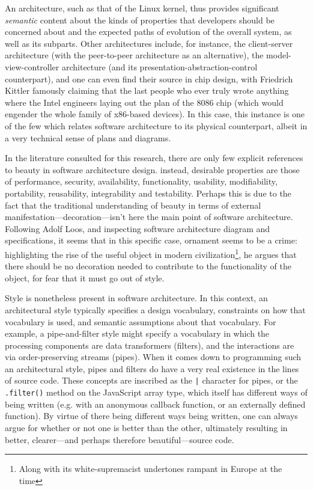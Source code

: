 \documentclass{article}
\begin{document}
An architecture, such as that of the Linux kernel, thus provides significant \emph{semantic}  content  about  the  kinds  of properties that developers should be concerned about and the expected paths of evolution of the overall system, as well as its subparts. Other architectures include, for instance, the client-server architecture (with the peer-to-peer architecture as an alternative), the model-view-controller architecture (and its presentation-abstraction-control counterpart), and one can even find their source in chip design, with Friedrich Kittler famously claiming that the last people who ever truly wrote anything where the Intel engineers laying out the plan of the 8086 chip (which would engender the whole family of x86-based devices)\cite{kittler_there_1997}. In this case, this instance is one of the few which relates software architecture to its physical counterpart, albeit in a very technical sense of plans and diagrams.

In the literature consulted for this research, there are only few explicit references to beauty in software architecture design. instead, desirable properties are those of performance, security, availability, functionality, usability, modifiability, portability, reusability, integrability and testability. Perhaps this is due to the fact that the traditional understanding of beauty in terms of external manifestation—decoration—isn't here the main point of software architecture. Following Adolf Loos, and inspecting software architecture diagram and specifications, it seems that in this specific case, ornament seems to be a crime: highlighting the rise of the useful object in modern civilization\footnote{Along with its white-supremacist undertones rampant in Europe at the time}, he argues that there should be no decoration needed to contribute to the functionality of the object, for fear that it must go out of style.

Style is nonetheless present in software architecture. In this context, an architectural style typically specifies a design vocabulary, constraints on how that vocabulary is used, and semantic assumptions about that vocabulary. For example, a pipe-and-filter style might specify a vocabulary in which the processing components are data transformers (filters), and the interactions are via order-preserving streams (pipes). When it comes down to programming such an architectural style, pipes and filters do have a very real existence in the lines of source code. These concepts are inscribed as the \lstinline{|} character for pipes, or the \lstinline{.filter()} method on the JavaScript array type, which itself has different ways of being written (e.g. with an anonymous callback function, or an externally defined function). By virtue of there being different ways being written, one can always argue for whether or not one is better than the other, ultimately resulting in better, clearer—and perhaps therefore beautiful—source code.
\end{document}
